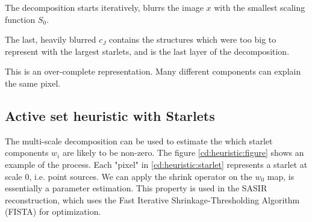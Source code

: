 The decomposition starts iteratively, blurrs the image $x$ with the smallest scaling function $S_0$. 


The last, heavily blurred $c_J$ contains the structures which were too big to represent with the largest starlets, and is the last layer of the decomposition.

This is an over-complete representation. Many different components can explain the same pixel.




\subsection{Active set heuristic with Starlets}\label{cd:heuristic}

The multi-scale decomposition can be used to estimate the which starlet components $w_i$ are likely to be non-zero. The figure \ref{cd:heuristic:figure} shows an example of the process. Each "pixel" in \ref{cd:heuristic:starlet} represents a starlet at scale 0, i.e. point sources. We can apply the shrink operator on the $w_0$ map, is essentially a parameter estimation. This property is used in the SASIR\cite{girard2015sparse} reconstruction, which uses the Fast Iterative Shrinkage-Thresholding Algorithm (FISTA) for optimization.

